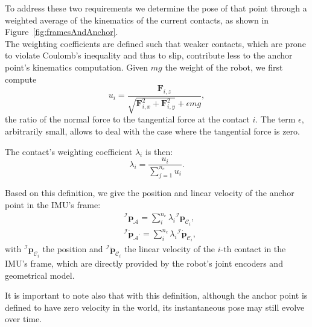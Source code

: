 \documentclass{IJCAS}
\begin{document}
To address these two requirements we determine the pose of that point through a weighted average of the kinematics of the current contacts, as shown in Figure~\ref{fig:framesAndAnchor}.  \\
The weighting coefficients are defined such that weaker contacts, which are prone to violate Coulomb's inequality and thus to slip, contribute less to the anchor point's kinematics computation. Given $mg$ the weight of the robot, we first compute 
\begin{equation}
    u_{i} = \frac{\boldsymbol{F}_{i,z}}{\sqrt{\boldsymbol{F}_{i,x}^2 + \boldsymbol{F}_{i,y}^2} + \epsilon mg}, \label{eq:ratio_ui}
\end{equation}
the ratio of the normal force to the tangential force at the contact $i$. The term $\epsilon$, arbitrarily small, allows to deal with the case where the tangential force is zero.

The contact's weighting coefficient $\lambda_{i}$ is then:
\begin{equation}
    \lambda_{i}=\frac{u_{i}}{\sum^{n_{c}}_{j=1}u_{i}}.
\end{equation}

Based on this definition, we give the position and linear velocity of the anchor point in the IMU's frame:
\begin{align} 
&{^{\mathcal{I}}}\boldsymbol{p}_{\mathcal{A}} = \sum^{n_{c}}_{i} \lambda_{i}  {^{\mathcal{I}}} \boldsymbol{p}_{{\mathcal{C}}_{i}}, \label{eq:imuAnchorPos} \\
&{^{\mathcal{I}}} \dot{\boldsymbol{p}}_{\mathcal{A}^{\prime}} = \sum^{n_{c}}_{i} \lambda_{i}  {^{\mathcal{I}}} \dot{\boldsymbol{p}}_{{\mathcal{C}}_{i}}, \label{eq:imuAnchorVel}
\end{align} 
with ${^{\mathcal{I}}} \boldsymbol{p}_{{\mathcal{C}}_{i}}$ the position and ${^{\mathcal{I}}} \dot{\boldsymbol{p}}_{{\mathcal{C}}_{i}}$ the linear velocity of the $i$-th contact in the IMU's frame, which are directly provided by the robot's joint encoders and geometrical model.

It is important to note also that with this definition, although the anchor point is defined to have zero velocity in the world, its instantaneous pose may still evolve over time.
\end{document}
